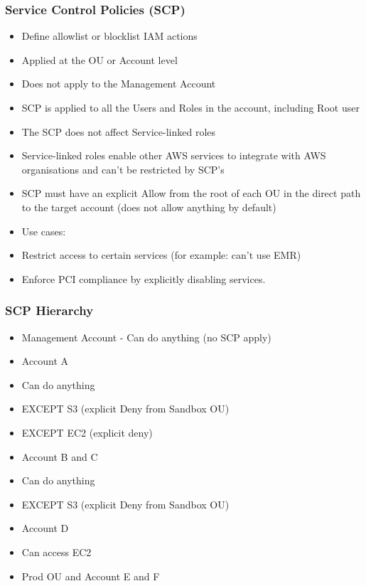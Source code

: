 \subsubsection{Service Control Policies (SCP)}
\begin{itemize}
    \item Define allowlist or blocklist IAM actions
    \item Applied at the OU or Account level
    \item Does not apply to the Management Account
    \item SCP is applied to all the Users and Roles in the account, including Root user
    \item The SCP does not affect Service-linked roles
    \item Service-linked roles enable other AWS services to integrate with AWS organisations and can't be restricted by SCP's
    \item SCP must have an explicit Allow from the root of each OU in the direct path to the target account (does not allow anything by default)
    \item Use cases:
    \item Restrict access to certain services (for example: can't use EMR)
    \item Enforce PCI compliance by explicitly disabling services.
\end{itemize}

\subsubsection{SCP Hierarchy}
\begin{itemize}
    \item Management Account - Can do anything (no SCP apply)
    \item Account A
    \item Can do anything
    \item EXCEPT S3 (explicit Deny from Sandbox OU)
    \item EXCEPT EC2 (explicit deny)
    \item Account B and C
    \item Can do anything
    \item EXCEPT S3 (explicit Deny from Sandbox OU)
    \item Account D
    \item Can access EC2
    \item Prod OU and Account E and F
\end{itemize}

